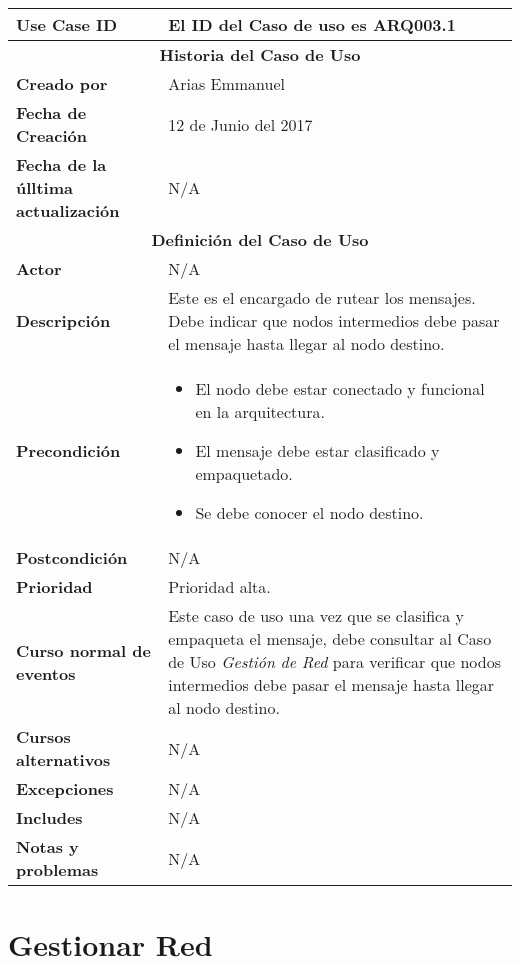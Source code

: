 \begin{longtable}{|p{5cm}|p{8cm}|}
  \hline
  \textbf{Use Case ID} & El ID del Caso de uso es ARQ003.1 \\ \hline
  \multicolumn{2}{|c|}{\Large\textbf{Historia del Caso de Uso}} \\ \hline
  \textbf{Creado por} & Arias Emmanuel \\ \hline
  \textbf{Fecha de Creación} & 12 de Junio del 2017 \\ \hline
  \textbf{Fecha de la úlltima actualización} & N/A \\ \hline
  \multicolumn{2}{|c|}{\Large\textbf{Definición del Caso de Uso}} \\ \hline
  \textbf{Actor} & N/A \\ \hline
  \textbf{Descripción} & Este es el encargado de rutear los mensajes. Debe indicar que nodos intermedios
debe pasar el mensaje hasta llegar al nodo destino. \\ \hline
  \textbf{Precondición} & \begin{itemize}
\item El nodo debe estar conectado y funcional en la arquitectura.
\item El mensaje debe estar clasificado y empaquetado.
\item Se debe conocer el nodo destino. 
\end{itemize} \\ \hline
  \textbf{Postcondición}  & N/A \\ \hline
  \textbf{Prioridad} & Prioridad alta. \\ \hline
  \textbf{Curso normal de eventos} & Este caso de uso una vez que se clasifica y empaqueta el mensaje,
debe consultar al Caso de Uso \textit{Gestión de Red} para verificar
que nodos intermedios debe pasar el mensaje hasta llegar al nodo
destino.  \\ \hline
\textbf{Cursos alternativos} & N/A \\ \hline
\textbf{Excepciones} & N/A \\ \hline
\textbf{Includes} & N/A \\ \hline
\textbf{Notas y problemas} & N/A \\ \hline
\end{longtable}


\section{Gestionar Red}\label{uc:GestionarRed}

